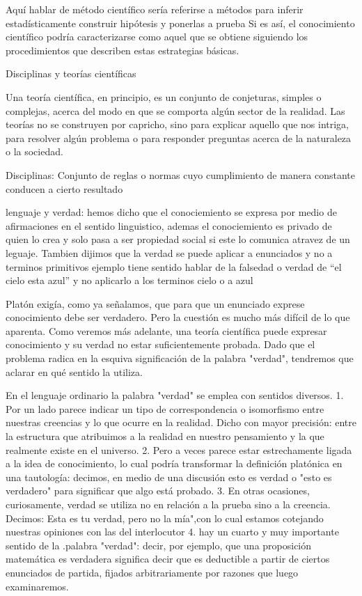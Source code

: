 \documentclass{article}
\begin{document}
Aquí hablar de método científico sería referirse a métodos para inferir estadísticamente construir hipótesis y ponerlas a prueba Si es así, el conocimiento científico podría caracterizarse como aquel que se obtiene siguiendo los procedimientos que describen estas estrategias básicas.


Disciplinas y teorías científicas

Una teoría científica, en principio, es un conjunto de conjeturas, simples o complejas, acerca del modo en que se comporta algún sector de la realidad. Las teorías no se construyen por capricho, sino para explicar aquello que nos intriga, para resolver algún problema o para responder preguntas acerca de la naturaleza o la sociedad.

Disciplinas: Conjunto de reglas o normas cuyo cumplimiento de manera constante conducen a cierto resultado

lenguaje y verdad: hemos dicho que el conociemiento se expresa por medio de afirmaciones en el sentido linguistico, ademas el conociemiento es privado de quien lo crea y solo pasa a ser propiedad social si este lo comunica atravez de un leguaje.
Tambien dijimos que la verdad se puede aplicar a enunciados y no a terminos primitivos 
ejemplo tiene sentido hablar de la falsedad o verdad de “el cielo esta azul” y no aplicarlo a los terminos cielo o a azul

Platón exigía, como ya señalamos, que para que un enunciado exprese conocimiento debe ser verdadero. Pero la cuestión es mucho más difícil de lo que aparenta. Como veremos más adelante, una teoría científica puede expresar conocimiento y su verdad no estar suficientemente probada. Dado que el problema radica en la esquiva significación de la palabra "verdad", tendremos que aclarar en qué sentido la utiliza.


En el lenguaje ordinario la palabra "verdad" se emplea con sentidos diversos. 
    1. Por un lado parece indicar un tipo de correspondencia o isomorfismo entre nuestras creencias y lo que ocurre en la realidad. Dicho con mayor precisión: entre la estructura que atribuimos a la realidad en nuestro pensamiento y la que realmente existe en el universo.
    2. Pero a veces parece estar estrechamente ligada a la idea de conocimiento, lo cual podría transformar la definición platónica en una tautología: decimos, en medio de una discusión esto es verdad o "esto es verdadero" para significar que algo está probado. 
    3. En otras ocasiones, curiosamente, verdad se utiliza no en relación a la prueba sino a la creencia. Decimos: Esta es tu verdad, pero no la mía",con lo cual estamos cotejando nuestras opiniones con las del interlocutor
    4. hay un cuarto y muy importante sentido de la .palabra "verdad": decir, por ejemplo, que una proposición matemática es verdadera significa decir que es deductible a partir de ciertos enunciados de partida, fijados arbitrariamente por razones que luego examinaremos.
       
\end{document}
